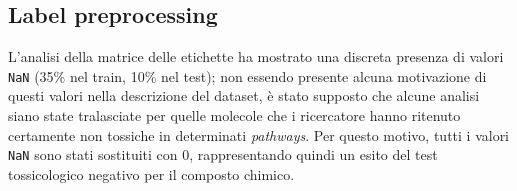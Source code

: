 \subsection{Label preprocessing}
L'analisi della matrice delle etichette ha mostrato una discreta presenza di valori \texttt{NaN} (35\% nel train, 10\% nel test); non essendo presente alcuna motivazione di questi valori nella descrizione del dataset, è stato supposto che alcune analisi siano state tralasciate per quelle molecole che i ricercatore hanno ritenuto certamente non tossiche in determinati \textit{pathways}. Per questo motivo, tutti i valori \texttt{NaN} sono stati sostituiti con $0$, rappresentando quindi un esito del test tossicologico negativo per il composto chimico. \\
\begin{figure}[!ht]
	\centering
	\quad
	\quad
	\quad
	\\	\quad
	\quad

\end{figure}
